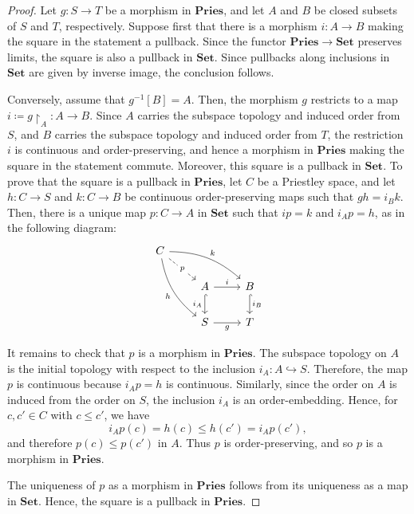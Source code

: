 \documentclass[12pt]{amsart}
\theoremstyle{plain}
\theoremstyle{definition}
\newcommand{\cat}[1]{\mathbf{#1}}
\newcommand{\Set}{\cat{Set}}
\newcommand{\Pries}{\cat{Pries}}
\begin{document}
\begin{proof}
    Let $g \colon S \to T$ be a morphism in $\Pries$, and let $A$ and $B$ be closed subsets of $S$ and $T$, respectively.
    Suppose first that there is a morphism $i \colon A \to B$ making the square in the statement a pullback.
    Since the functor $\Pries\to\Set$ preserves limits, the square is also a pullback in $\Set$.
    Since pullbacks along inclusions in $\Set$ are given by inverse image, the conclusion follows.


    Conversely, assume that $g^{-1}[B]=A$. Then, the morphism $g$ restricts to a map $i\coloneqq g{\restriction}_A\colon A\to B$. Since $A$ carries the subspace topology and induced order from $S$, and $B$ carries the subspace topology and induced order from $T$, the restriction $i$ is continuous and order-preserving, and hence a morphism in $\Pries$ making the square in the statement commute. 
    Moreover, this square is a pullback in $\Set$. To prove that the square is a pullback in $\Pries$, let $C$ be a Priestley space, and let $h\colon C\to  S$ and $k\colon C\to B$ be continuous order-preserving maps such that $g h= i_B k$. Then, there is a unique map $p\colon C\to A$ in $\Set$ such that $ip=k$ and $i_A p=h$, as in the following diagram:
    \[
    \begin{tikzcd}
    	C && \\
    	& A & B \\
    	& S & T
    	\arrow["p"{description}, dashed, from=1-1, to=2-2]
    	\arrow["k", from=1-1, to=2-3, bend left = 2em]
    	\arrow["h"', from=1-1, to=3-2, bend right = 2em]
    	\arrow["i", from=2-2, to=2-3]
    	\arrow["{i_A}"', hook, from=2-2, to=3-2]
    	\arrow["{i_B}", hook, from=2-3, to=3-3]
    	\arrow["g"', from=3-2, to=3-3]
    \end{tikzcd}
    \]
    
    It remains to check that $p$ is a morphism in $\Pries$. The subspace topology on $A$ is the initial topology with respect to the inclusion $i_A\colon A\hookrightarrow S$.
    Therefore, the map $p$ is continuous because $i_Ap=h$ is continuous. Similarly, since the order on $A$ is induced from the order on $S$, the inclusion $i_A$ is an order-embedding. Hence, for $c,c'\in C$ with $c\leq c'$, we have
    \[
    i_Ap(c)=h(c)\leq h(c')=i_Ap(c'),
    \]
    and therefore $p(c)\leq p(c')$ in $A$. Thus $p$ is order-preserving, and so $p$ is a morphism in $\Pries$.
    
    The uniqueness of $p$ as a morphism in $\Pries$ follows from its uniqueness as a map in $\Set$. Hence, the square is a pullback in $\Pries$.
    

\end{proof}
\end{document}

